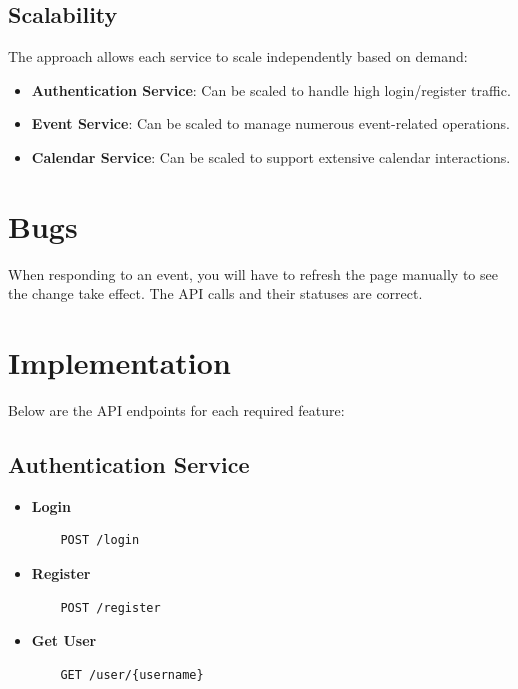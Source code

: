 \documentclass{article}
\begin{document}
\subsection{Scalability}
The approach allows each service to scale independently based on demand:
\begin{itemize}
    \item \textbf{Authentication Service}: Can be scaled to handle high login/register traffic.
    \item \textbf{Event Service}: Can be scaled to manage numerous event-related operations.
    \item \textbf{Calendar Service}: Can be scaled to support extensive calendar interactions.
\end{itemize}

\section{Bugs}
When responding to an event, you will have to refresh the page manually to see the change take effect. The API calls and their statuses are correct.

\section{Implementation}
Below are the API endpoints for each required feature:

\subsection{Authentication Service}
\begin{itemize}
    \item \textbf{Login}
    \begin{verbatim}
    POST /login
    \end{verbatim}
    \item \textbf{Register}
    \begin{verbatim}
    POST /register
    \end{verbatim}
    \item \textbf{Get User}
    \begin{verbatim}
    GET /user/{username}
    \end{verbatim}
\end{itemize}
\end{document}
